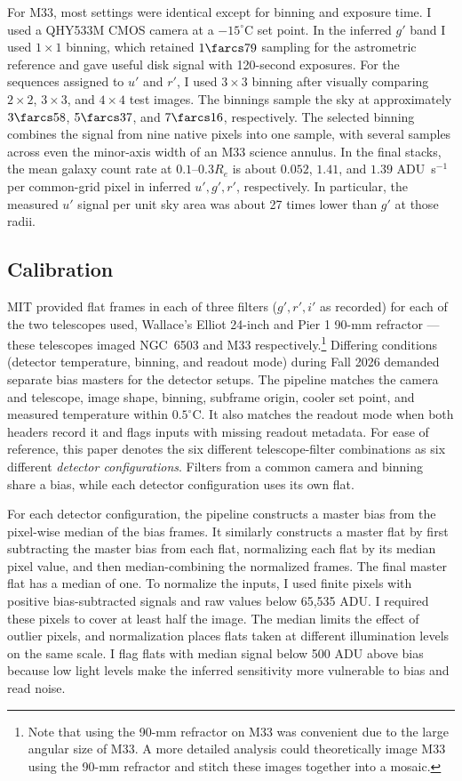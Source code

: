 For M33, most settings were identical except for binning and exposure time. I used a QHY533M CMOS camera at a $-15^{\circ}$C set point. In the inferred $g'$ band I used $1\times1$ binning, which retained $1\farcs79$ sampling for the astrometric reference and gave useful disk signal with 120-second exposures. For the sequences assigned to $u'$ and $r'$, I used $3\times3$ binning after visually comparing $2\times2$, $3\times3$, and $4\times4$ test images. The binnings sample the sky at approximately $3\farcs58$, $5\farcs37$, and $7\farcs16$, respectively. The selected binning combines the signal from nine native pixels into one sample, with several samples across even the minor-axis width of an M33 science annulus. In the final stacks, the mean galaxy count rate at $0.1$--$0.3R_e$ is about $0.052$, $1.41$, and $1.39$ ADU~s$^{-1}$ per common-grid pixel in inferred $u',g',r'$, respectively. In particular, the measured $u'$ signal per unit sky area was about 27 times lower than $g'$ at those radii.

\subsection{Calibration}
\label{sec:detector-calibration}

MIT provided flat frames in each of three filters ($g',r',i'$ as recorded) for each of the two telescopes used, Wallace's Elliot 24-inch and Pier 1 90-mm refractor --- these telescopes imaged NGC~6503 and M33 respectively.\footnote{Note that using the 90-mm refractor on M33 was convenient due to the large angular size of M33. A more detailed analysis could theoretically image M33 using the 90-mm refractor and stitch these images together into a mosaic.} Differing conditions (detector temperature, binning, and readout mode) during Fall 2026 demanded separate bias masters for the detector setups. The pipeline matches the camera and telescope, image shape, binning, subframe origin, cooler set point, and measured temperature within $0.5^{\circ}$C. It also matches the readout mode when both headers record it and flags inputs with missing readout metadata. For ease of reference, this paper denotes the six different telescope-filter combinations as six different \textit{detector configurations}. Filters from a common camera and binning share a bias, while each detector configuration uses its own flat.

For each detector configuration, the pipeline constructs a master bias from the pixel-wise median of the bias frames. It similarly constructs a master flat by first subtracting the master bias from each flat, normalizing each flat by its median pixel value, and then median-combining the normalized frames. The final master flat has a median of one. To normalize the inputs, I used finite pixels with positive bias-subtracted signals and raw values below 65,535 ADU. I required these pixels to cover at least half the image. The median limits the effect of outlier pixels, and normalization places flats taken at different illumination levels on the same scale. I flag flats with median signal below 500 ADU above bias because low light levels make the inferred sensitivity more vulnerable to bias and read noise.

